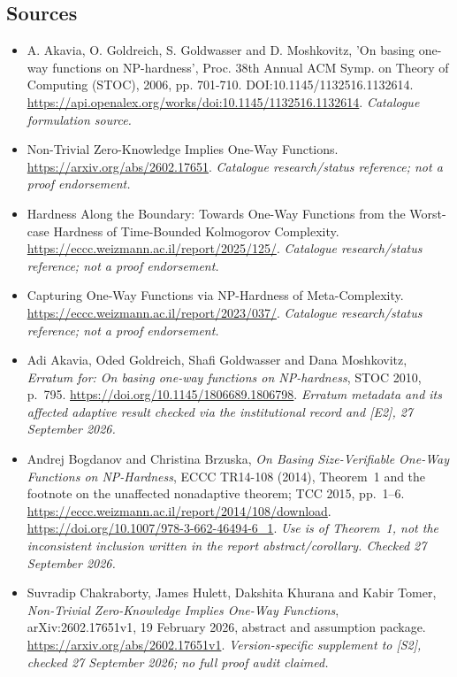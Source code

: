 \documentclass[11pt,a4paper]{article}
\numberwithin{equation}{section}
\begin{document}
\subsection{Sources}
\begin{itemize}\raggedright
\item[\textnormal{[S1]}]\hypertarget{source:30006686:1}{} A. Akavia, O. Goldreich, S. Goldwasser and D. Moshkovitz, 'On basing one-way functions on NP-hardness', Proc. 38th Annual ACM Symp. on Theory of Computing (STOC), 2006, pp. 701-710. DOI:10.1145/1132516.1132614.
\url{https://api.openalex.org/works/doi:10.1145/1132516.1132614}.
{\small\textit{Catalogue formulation source.}}
\item[\textnormal{[S2]}]\hypertarget{source:30006686:2}{} Non-Trivial Zero-Knowledge Implies One-Way Functions.
\url{https://arxiv.org/abs/2602.17651}.
{\small\textit{Catalogue research/status reference; not a proof endorsement.}}
\item[\textnormal{[S3]}]\hypertarget{source:30006686:3}{} Hardness Along the Boundary: Towards One-Way Functions from the Worst-case Hardness of Time-Bounded Kolmogorov Complexity.
\url{https://eccc.weizmann.ac.il/report/2025/125/}.
{\small\textit{Catalogue research/status reference; not a proof endorsement.}}
\item[\textnormal{[S4]}]\hypertarget{source:30006686:4}{} Capturing One-Way Functions via NP-Hardness of Meta-Complexity.
\url{https://eccc.weizmann.ac.il/report/2023/037/}.
{\small\textit{Catalogue research/status reference; not a proof endorsement.}}
\item[\textnormal{[E1]}]\hypertarget{extra:30006686:1}{} Adi Akavia, Oded
Goldreich, Shafi Goldwasser and Dana Moshkovitz, \emph{Erratum for: On
basing one-way functions on NP-hardness}, STOC 2010, p.~795.
\url{https://doi.org/10.1145/1806689.1806798}.
{\small\textit{Erratum metadata and its affected adaptive result checked
via the institutional record and [E2], 27 September 2026.}}
\item[\textnormal{[E2]}]\hypertarget{extra:30006686:2}{} Andrej Bogdanov and
Christina Brzuska, \emph{On Basing Size-Verifiable One-Way Functions on
NP-Hardness}, ECCC TR14-108 (2014), Theorem~1 and the footnote on the
unaffected nonadaptive theorem; TCC 2015, pp.~1--6.
\url{https://eccc.weizmann.ac.il/report/2014/108/download}.
\url{https://doi.org/10.1007/978-3-662-46494-6_1}.
{\small\textit{Use is of Theorem~1, not the inconsistent inclusion written
in the report abstract/corollary. Checked 27 September 2026.}}
\item[\textnormal{[E3]}]\hypertarget{extra:30006686:3}{} Suvradip Chakraborty,
James Hulett, Dakshita Khurana and Kabir Tomer, \emph{Non-Trivial
Zero-Knowledge Implies One-Way Functions}, arXiv:2602.17651v1,
19 February 2026, abstract and assumption package.
\url{https://arxiv.org/abs/2602.17651v1}.
{\small\textit{Version-specific supplement to [S2], checked
27 September 2026; no full proof audit claimed.}}

\end{itemize}

\end{document}
